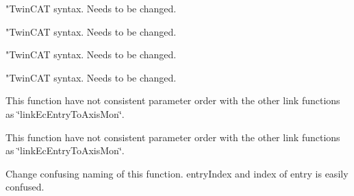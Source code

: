 \begin{DoxyRefList}
\item[\label{todo__todo000007}%
\hypertarget{todo__todo000007}{}%
Member \hyperlink{ecmcMotion_8h_a85195fec14ea20f2293b20e1fc275534}{get\-Axis\-Status\-Struct\-V2} (int axis\-Index, char $\ast$buffer, int buffer\-Byte\-Size)]"Twin\-C\-A\-T syntax. Needs to be changed.\par
  
\item[\label{todo__todo000022}%
\hypertarget{todo__todo000022}{}%
Member \hyperlink{ecmcMotion_8h_a420b3f76fea55aa97afa302f2a4823ef}{get\-Axis\-Target\-Pos} (int axis\-Index, double $\ast$value)]"Twin\-C\-A\-T syntax. Needs to be changed.\par
  
\item[\label{todo__todo000023}%
\hypertarget{todo__todo000023}{}%
Member \hyperlink{ecmcMotion_8h_a314d448adff0fdef109221e9e76dfe7a}{get\-Axis\-Target\-Vel} (int axis\-Index, double $\ast$value)]"Twin\-C\-A\-T syntax. Needs to be changed.\par
  
\item[\label{todo__todo000051}%
\hypertarget{todo__todo000051}{}%
Member \hyperlink{ecmcGeneral_8h_a7c97a785e0d0614cd9b906b7e344d636}{get\-Error\-String} (int error\-Number)]"Twin\-C\-A\-T syntax. Needs to be changed.\par
  
\item[\label{todo__todo000001}%
\hypertarget{todo__todo000001}{}%
Member \hyperlink{ecmcMisc_8h_ace18ea8b9ce1804ae7cf8169e021caec}{link\-Ec\-Entry\-To\-Event} (int index\-Event, int event\-Entry\-Index, int slave\-Bus\-Position, char $\ast$entry\-I\-D\-String, int bit\-Index)]This function have not consistent parameter order with the other link functions as \char`\"{}link\-Ec\-Entry\-To\-Axis\-Mon\char`\"{}.\par
  
\item[\label{todo__todo000003}%
\hypertarget{todo__todo000003}{}%
Member \hyperlink{ecmcMisc_8h_a99c30875ea25f275be26990f47b8b2a3}{link\-Ec\-Entry\-To\-Recorder} (int index\-Recorder, int recorder\-Entry\-Index, int slave\-Bus\-Position, char $\ast$entry\-I\-D\-String, int bit\-Index)]This function have not consistent parameter order with the other link functions as \char`\"{}link\-Ec\-Entry\-To\-Axis\-Mon\char`\"{}.\par
  
\item[\label{todo__todo000052}%
\hypertarget{todo__todo000052}{}%
Member \hyperlink{ecmcEthercat_8h_aa0ce7aef669dc0114a9018c22dd72f3e}{read\-Ec\-Entry\-Index\-I\-D\-String} (int slave\-Position, char $\ast$entry\-I\-D\-String, int $\ast$value)]Change confusing naming of this function. entry\-Index and index of entry is easily confused.\par
 

\end{DoxyRefList}
